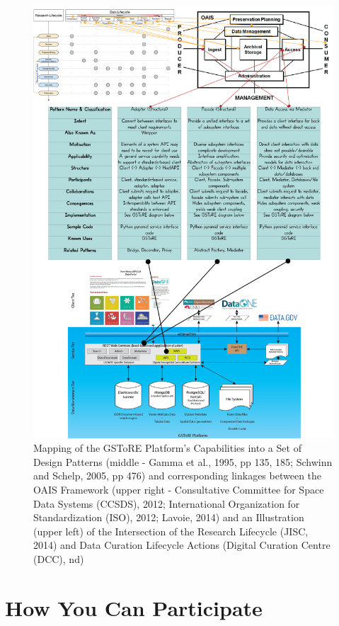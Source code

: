 \documentclass[final]{beamer}
\begin{document}
\begin{frame}[t]
\begin{multicols}{2}
\begin{figure}[htbp]
\centering
\includegraphics[width=7.50000in]{Composite-DesignPatternMapping.png}
\caption{Mapping of the GSToRE Platform's Capabilities into a Set of
Design Patterns (middle - Gamma et al., 1995, pp 135, 185; Schwinn and
Schelp, 2005, pp 476) and corresponding linkages between the OAIS
Framework (upper right - Consultative Committee for Space Data Systems
(CCSDS), 2012; International Organization for Standardization (ISO),
2012; Lavoie, 2014) and an Illustration (upper left) of the Intersection
of the Research Lifecycle (JISC, 2014) and Data Curation Lifecycle
Actions (Digital Curation Centre (DCC), nd)}
\end{figure}

\section{How You Can Participate}\label{how-you-can-participate}


\end{multicols}
\end{frame}
\end{document}
